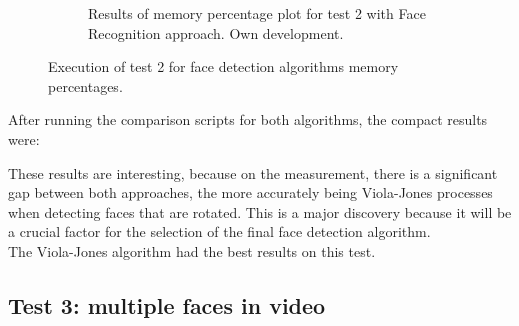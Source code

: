 \documentclass[11pt]{report} %
\begin{document}
\begin{figure}[H]
\begin{subfigure}{.5\textwidth}
		\caption{Results of memory percentage plot for test 2 with Face Recognition approach. Own development.}
		\label{fig_computer_vision_test_2_memory_b}
	\end{subfigure}%
	\caption{Execution of test 2 for face detection algorithms memory percentages.}
	\label{fig_computer_vision_test_2_memory}
\end{figure}


After running the comparison scripts for both algorithms, the compact results were:

\begin{table}[H]
\begin{center}
\caption{\label{tab:results_of_test_1_for_face_detection} Results of test 1 for face detection algorithms. Own development.}
\end{center}
\end{table}

These results are interesting, because on the  measurement, there is a significant gap between both approaches, the more accurately being Viola-Jones processes when detecting faces that are rotated. This is a major discovery because it will be a crucial factor for the selection of the final face detection algorithm.\\

The Viola-Jones algorithm had the best results on this test.\\


\subsection{Test 3: multiple faces in video}
\label{sec:test_3_multiple_faces_in_video}
\end{document}
